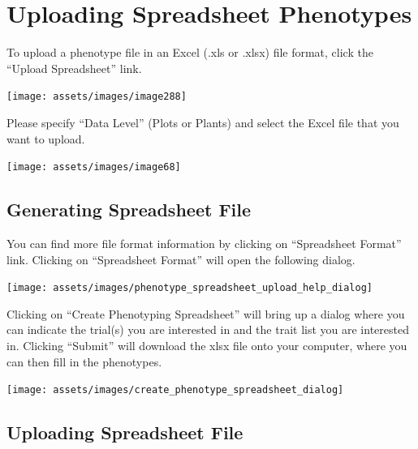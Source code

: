 \documentclass[
  12pt,
]{book}
\begin{document}
\hypertarget{uploading-spreadsheet-phenotypes}{%
\section{Uploading Spreadsheet Phenotypes}\label{uploading-spreadsheet-phenotypes}}

To upload a phenotype file in an Excel (.xls or .xlsx) file format, click the ``Upload Spreadsheet'' link.

\begin{center}\texttt{[image: assets/images/image288]} \end{center}

Please specify ``Data Level'' (Plots or Plants) and select the Excel file that you want to upload.

\begin{center}\texttt{[image: assets/images/image68]} \end{center}

\hypertarget{generating-spreadsheet-file}{%
\subsection{Generating Spreadsheet File}\label{generating-spreadsheet-file}}

You can find more file format information by clicking on ``Spreadsheet Format'' link. Clicking on ``Spreadsheet Format'' will open the following dialog.

\begin{center}\texttt{[image: assets/images/phenotype\_spreadsheet\_upload\_help\_dialog]} \end{center}

Clicking on ``Create Phenotyping Spreadsheet'' will bring up a dialog where you can indicate the trial(s) you are interested in and the trait list you are interested in. Clicking ``Submit'' will download the xlsx file onto your computer, where you can then fill in the phenotypes.

\begin{center}\texttt{[image: assets/images/create\_phenotype\_spreadsheet\_dialog]} \end{center}

\hypertarget{uploading-spreadsheet-file}{%
\subsection{Uploading Spreadsheet File}\label{uploading-spreadsheet-file}}
\end{document}
